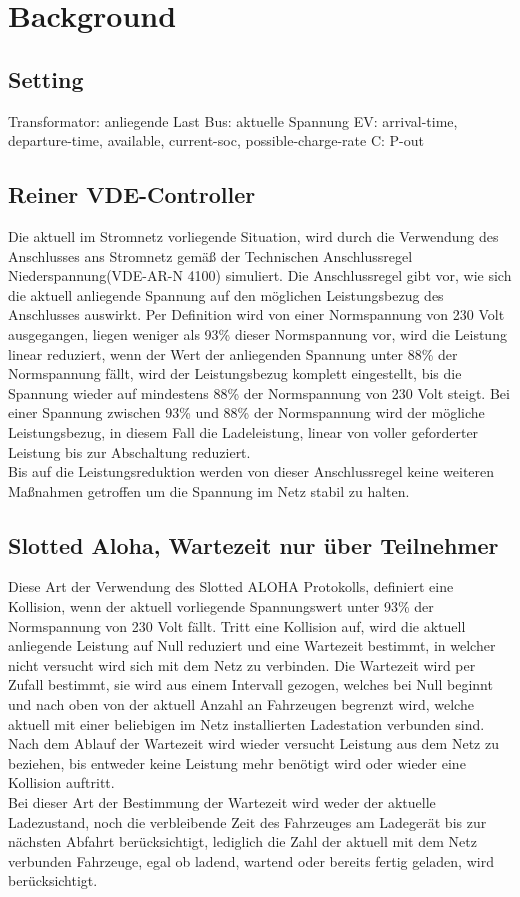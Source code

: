 \chapter{Background}
\label{chap:background}
\section{Setting}
\label{cap:background_sec:setting}
Transformator: anliegende Last
Bus: aktuelle Spannung
EV: arrival-time, departure-time, available, current-soc, possible-charge-rate
C: P-out

\section{Reiner VDE-Controller}
\label{cap:background_sec:pureVDE}
Die aktuell im Stromnetz vorliegende Situation, wird durch die Verwendung des Anschlusses ans Stromnetz gemäß der Technischen Anschlussregel Niederspannung(VDE-AR-N 4100) simuliert. Die Anschlussregel gibt vor, wie sich die aktuell anliegende Spannung auf den möglichen Leistungsbezug des Anschlusses auswirkt. Per Definition wird von einer Normspannung von 230 Volt ausgegangen, liegen weniger als 93\% dieser Normspannung vor, wird die Leistung linear reduziert, wenn der Wert der anliegenden Spannung unter 88\% der Normspannung fällt, wird der Leistungsbezug komplett eingestellt, bis die Spannung wieder auf mindestens 88\% der Normspannung von 230 Volt steigt. Bei einer Spannung zwischen 93\% und 88\% der Normspannung wird der mögliche Leistungsbezug, in diesem Fall die Ladeleistung, linear von voller geforderter Leistung bis zur Abschaltung reduziert.\\
Bis auf die Leistungsreduktion werden von dieser Anschlussregel keine weiteren Maßnahmen getroffen um die Spannung im Netz stabil zu halten. 

\section{Slotted Aloha, Wartezeit nur über Teilnehmer}
\label{cap:background_sec:SA_participants}
Diese Art der Verwendung des Slotted ALOHA Protokolls, definiert eine Kollision, wenn der aktuell vorliegende Spannungswert unter 93\% der Normspannung von 230 Volt fällt. Tritt eine Kollision auf, wird die aktuell anliegende Leistung auf Null reduziert und eine Wartezeit bestimmt, in welcher nicht versucht wird sich mit dem Netz zu verbinden. Die Wartezeit wird per Zufall bestimmt, sie wird aus einem Intervall gezogen, welches bei Null beginnt und nach oben von der aktuell Anzahl an Fahrzeugen begrenzt wird, welche aktuell mit einer beliebigen im Netz installierten Ladestation verbunden sind. Nach dem Ablauf der Wartezeit wird wieder versucht Leistung aus dem Netz zu beziehen, bis entweder keine Leistung mehr benötigt wird oder wieder eine Kollision auftritt.\\
Bei dieser Art der Bestimmung der Wartezeit wird weder der aktuelle Ladezustand, noch die verbleibende Zeit des Fahrzeuges am Ladegerät bis zur nächsten Abfahrt berücksichtigt, lediglich die Zahl der aktuell mit dem Netz verbunden Fahrzeuge, egal ob ladend, wartend oder bereits fertig geladen, wird berücksichtigt.

